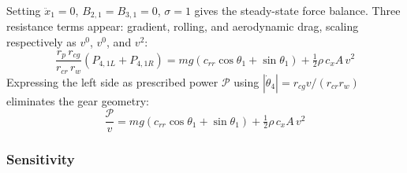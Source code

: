 \documentclass[10pt]{extarticle}
\numberwithin{equation}{subsubsection}
\begin{document}
Setting $\ddot{x}_1 = 0$, $B_{2,1} = B_{3,1} = 0$, $\sigma = 1$ gives the steady-state force balance. Three resistance terms appear: gradient, rolling, and aerodynamic drag, scaling respectively as $v^0$, $v^0$, and $v^2$:
\begin{equation}
    \frac{r_p\,r_{cg}}{r_{cr}\,r_w}\left(P_{4,1L} + P_{4,1R}\right) = mg\left(c_{rr}\cos\theta_1 + \sin\theta_1\right) + \tfrac{1}{2}\rho\,c_x A\,v^2
\end{equation}
Expressing the left side as prescribed power $\mathcal{P}$ using $|\dot{\theta}_4| = r_{cg}v/(r_{cr}r_w)$ eliminates the gear geometry:
\begin{equation}
    \frac{\mathcal{P}}{v} = mg\left(c_{rr}\cos\theta_1 + \sin\theta_1\right) + \tfrac{1}{2}\rho\,c_x A\,v^2
\end{equation}

\subsubsection{Sensitivity}
\end{document}
